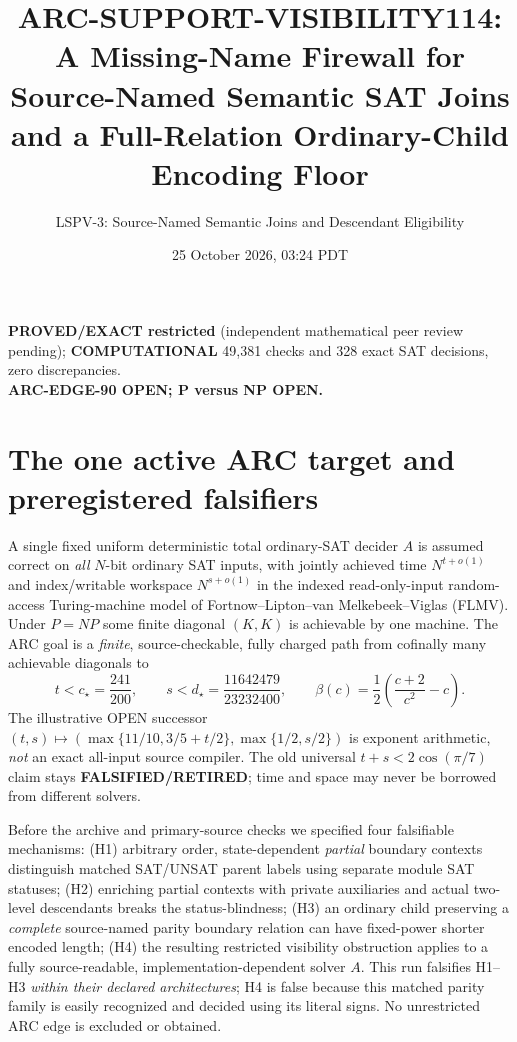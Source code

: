 \documentclass[11pt]{article}
\title{ARC-SUPPORT-VISIBILITY114:\\
A Missing-Name Firewall for Source-Named Semantic SAT Joins\\
and a Full-Relation Ordinary-Child Encoding Floor}
\author{LSPV-3: Source-Named Semantic Joins and Descendant Eligibility}
\date{25 October 2026, 03:24 PDT}
\newcommand{\EXACT}{\textbf{PROVED/EXACT restricted}}
\begin{document}
\maketitle
\begin{center}
\EXACT{} (independent mathematical peer review pending);
\textbf{COMPUTATIONAL} 49,381 checks and 328 exact SAT decisions, zero discrepancies.\\
\textbf{ARC-EDGE-90 OPEN; P versus NP OPEN.}
\end{center}

\section{The one active ARC target and preregistered falsifiers}
A single fixed uniform deterministic total ordinary-SAT decider $A$ is
assumed correct on \emph{all} $N$-bit ordinary SAT inputs, with jointly
achieved time $N^{t+o(1)}$ and index/writable workspace
$N^{s+o(1)}$ in the indexed read-only-input random-access Turing-machine
model of Fortnow--Lipton--van Melkebeek--Viglas (FLMV).
Under $P=NP$ some finite diagonal $(K,K)$ is achievable by one machine.
The ARC goal is a \emph{finite}, source-checkable, fully charged path
from cofinally many achievable diagonals to
\[
 t< c_\star=\frac{241}{200},\qquad
 s<d_\star=\frac{11642479}{23232400},\qquad
 \beta(c)=\frac12\left(\frac{c+2}{c^2}-c\right).
\]
The illustrative OPEN successor
$(t,s)\mapsto(\max\{11/10,3/5+t/2\},\max\{1/2,s/2\})$
is exponent arithmetic, \emph{not} an exact all-input source compiler.
The old universal $t+s<2\cos(\pi/7)$ claim stays
\textbf{FALSIFIED/RETIRED}; time and space may never be borrowed from
different solvers.

Before the archive and primary-source checks we specified four
falsifiable mechanisms: (H1) arbitrary order, state-dependent
\emph{partial} boundary contexts distinguish matched SAT/UNSAT parent
labels using separate module SAT statuses; (H2) enriching partial
contexts with private auxiliaries and actual two-level descendants
breaks the status-blindness; (H3) an ordinary child preserving a
\emph{complete} source-named parity boundary relation can have
fixed-power shorter encoded length; (H4) the resulting restricted
visibility obstruction applies to a fully source-readable,
implementation-dependent solver $A$. This run falsifies H1--H3
\emph{within their declared architectures}; H4 is false because this
matched parity family is easily recognized and decided using its
literal signs. No unrestricted ARC edge is excluded or obtained.
\end{document}
